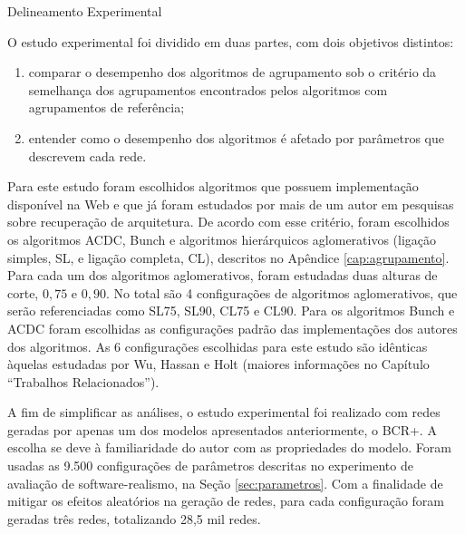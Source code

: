 \begin{section}{Delineamento Experimental}
	
	
	
	
	
	O estudo experimental foi dividido em duas partes, com dois objetivos distintos:
	\begin{enumerate}
		\item comparar o desempenho dos algoritmos de agrupamento sob o critério da semelhança dos agrupamentos encontrados pelos algoritmos com agrupamentos de referência;
		\item entender como o desempenho dos algoritmos é afetado por parâmetros que descrevem cada rede.
	\end{enumerate}

	Para este estudo foram escolhidos algoritmos que possuem implementação disponível na Web e que já foram estudados por mais de um autor em pesquisas sobre recuperação de arquitetura. De acordo com esse critério, foram escolhidos os algoritmos ACDC, Bunch e algoritmos hierárquicos aglomerativos (ligação simples, SL, e ligação completa, CL), descritos no Apêndice \ref{cap:agrupamento}. Para cada um dos algoritmos aglomerativos, foram estudadas duas alturas de corte, $0,75$ e $0,90$. No total são 4 configurações de algoritmos aglomerativos, que serão referenciadas como SL75, SL90, CL75 e CL90. Para os algoritmos Bunch e ACDC foram escolhidas as configurações padrão das implementações dos autores dos algoritmos. As 6 configurações escolhidas para este estudo são idênticas àquelas estudadas por Wu, Hassan e Holt \cite{Wu2005} (maiores informações no Capítulo ``Trabalhos Relacionados'').

	A fim de simplificar as análises, o estudo experimental foi realizado com redes geradas por apenas um dos modelos apresentados anteriormente, o BCR+. A escolha se deve à familiaridade do autor com as propriedades do modelo. Foram usadas as 9.500 configurações de parâmetros descritas no experimento de avaliação de software-realismo, na Seção \ref{sec:parametros}. Com a finalidade de mitigar os efeitos aleatórios na geração de redes, para cada configuração foram geradas três redes, totalizando 28,5 mil redes.

\end{section}


